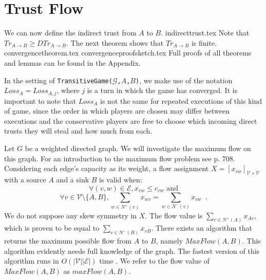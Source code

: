 \section{Trust Flow}
  We can now define the indirect trust from $A$ to $B$.
  {indirecttrust.tex}
  \noindent Note that $Tr_{A \rightarrow B} \geq DTr_{A \rightarrow B}$. The next theorem shows that $Tr_{A \rightarrow B}$ is
  finite.
  {convergencetheorem.tex}
  {convergenceproofsketch.tex}
  Full proofs of all theorems and lemmas can be found in the Appendix.

  In the setting of \texttt{TransitiveGame(}$\mathcal{G}$\texttt{,}$A$\texttt{,}$B$\texttt{)}, we make use of the notation
  $Loss_A = Loss_{A, j}$, where $j$ is a turn in which the game has converged. It is important to note that $Loss_A$ is not
  the same for repeated executions of this kind of game, since the order in which players are chosen may differ between
  executions and the conservative players are free to choose which incoming direct trusts they will steal and how much from
  each.

  Let $G$ be a weighted directed graph. We will investigate the maximum flow on this graph. For an introduction to the
  maximum flow problem see \cite{clrs} p. 708. Considering each edge's capacity as its weight, a flow assignment
  $X = [x_{vw}]_{\mathcal{V} \times \mathcal{V}}$ with a source $A$ and a sink $B$ is valid when:
  \begin{equation}
  \label{flow1}
    \forall (v, w) \in \mathcal{E}, x_{vw} \leq c_{vw} \mbox{ and}
  \end{equation}
  \begin{equation}
  \label{flow2}
    \forall v \in \mathcal{V} \setminus \{A,B\}, \sum\limits_{w \in N^{+}(v)}x_{wv} = \sum\limits_{w \in N^{-}(v)}x_{vw}
    \enspace.
  \end{equation}
  We do not suppose any skew symmetry in $X$. The flow value is $\sum\limits_{v \in N^{+}\left(A\right)}x_{Av}$, which is
  proven to be equal to $\sum\limits_{v \in N^{-}\left(B\right)}x_{vB}$. There exists an algorithm that returns the maximum
  possible flow from $A$ to $B$, namely $MaxFlow\left(A, B\right)$. This algorithm evidently needs full knowledge of the
  graph. The fastest version of this algorithm runs in $O\left(|\mathcal{V}||\mathcal{E}|\right)$ time \cite{maxflownm}. We
  refer to the flow value of $MaxFlow\left(A, B\right)$ as $maxFlow\left(A, B\right)$.


